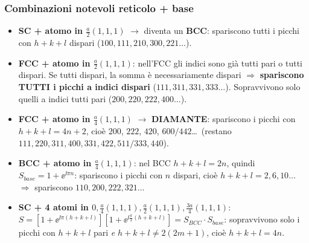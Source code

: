 \subsubsection*{Combinazioni notevoli reticolo + base}
\begin{itemize}
  \item \textbf{SC + atomo in $\frac{a}{2}(1,1,1)$} $\to$ diventa un \textbf{BCC}: spariscono tutti i picchi con $h+k+l$ dispari ($100,111,210,300,221\dots$).
  \item \textbf{FCC + atomo in $\frac{a}{2}(1,1,1)$}: nell'FCC gli indici sono già tutti pari o tutti dispari. Se tutti dispari, la somma è necessariamente dispari $\Rightarrow$ \textbf{spariscono TUTTI i picchi a indici dispari} ($111,311,331,333\dots$). Sopravvivono solo quelli a indici tutti pari ($200,220,222,400\dots$).
  \item \textbf{FCC + atomo in $\frac{a}{4}(1,1,1)$} $\to$ \textbf{DIAMANTE}: spariscono i picchi con $h+k+l=4n+2$, cioè $200$, $222$, $420$, $600/442$\dots\ (restano $111,220,311,400,331,422,511/333,440$).
  \item \textbf{BCC + atomo in $\frac{a}{4}(1,1,1)$}: nel BCC $h+k+l=2n$, quindi $S_{base}=1+\ee^{\ii\pi n}$: spariscono i picchi con $n$ dispari, cioè $h+k+l=2,6,10\dots$ $\Rightarrow$ spariscono $110,200,222,321\dots$
  \item \textbf{SC + 4 atomi in $0,\frac a4(1,1,1),\frac a2(1,1,1),\frac{3a}{4}(1,1,1)$}:
  $S=\left[1+\ee^{\ii\pi(h+k+l)}\right]\left[1+\ee^{\ii\frac\pi2(h+k+l)}\right] = S_{BCC}\cdot S_{base}$: sopravvivono solo i picchi con $h+k+l$ pari \emph{e} $h+k+l\neq 2(2m+1)$, cioè $h+k+l = 4n$.
\end{itemize}

